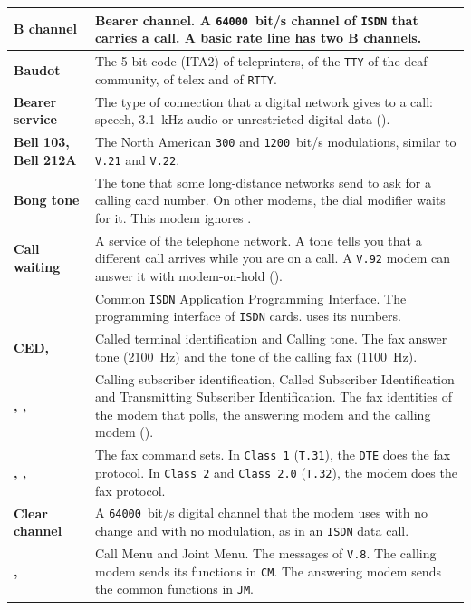 \documentclass[a5paper,10pt]{article}
\makeatletter
\newcommand{\cmd}[1]{\texttt{#1}}
\newcommand{\std}[1]{\texttt{#1}}
\newcommand{\stdb}[1]{\textpdfrender{TextRenderingMode=FillStroke,
  LineWidth=0.25pt}{\texttt{#1}}}
\newcommand{\cmdl}[2][]{\hyperlink{cmd:#1}{\cmd{#2}}}
\let\cmd\@firstofone
\makeatother
\begin{document}
{\begin{longtable}{|>{\raggedright\arraybackslash}p{}|>{\raggedright\arraybackslash}p{}|}
\textbf{B channel} & Bearer channel.  A \std{64000}~bit/s channel of \std{ISDN} that carries a call.  A basic rate line has two B channels. \\ \hline
\textbf{Baudot} & The 5-bit code (ITA2) of teleprinters, of the \std{TTY} of the deaf community, of telex and of \std{RTTY}. \\ \hline
\textbf{Bearer service} & The type of connection that a digital network gives to a call: speech, 3.1~kHz audio or unrestricted digital data (\cmdl[plusCBST]{+CBST}). \\ \hline
\textbf{Bell 103, Bell 212A} & The North American \std{300} and \std{1200}~bit/s modulations, similar to \std{V.21} and \std{V.22}. \\ \hline
\textbf{Bong tone} & The tone that some long-distance networks send to ask for a calling card number.  On other modems, the dial modifier \cmd{\$} waits for it.  This modem ignores \cmd{\$}. \\ \hline
\textbf{Call waiting} & A service of the telephone network.  A tone tells you that a different call arrives while you are on a call.  A \std{V.92} modem can answer it with modem-on-hold (\cmdl[plusPCW]{+PCW}). \\ \hline
\textbf{\stdb{CAPI}} & Common \std{ISDN} Application Programming Interface.  The programming interface of \std{ISDN} cards.  \cmdl[plusB2]{+B2} uses its numbers. \\ \hline
\textbf{CED, \stdb{CNG}} & Called terminal identification and Calling tone.  The fax answer tone (2100~Hz) and the tone of the calling fax (1100~Hz). \\ \hline
\textbf{\stdb{CIG}, \stdb{CSI}, \stdb{TSI}} & Calling subscriber identification, Called Subscriber Identification and Transmitting Subscriber Identification.  The fax identities of the modem that polls, the answering modem and the calling modem (\cmdl[plusFLI]{+FLI}). \\ \hline
\textbf{\stdb{Class 1}, \stdb{Class 2}, \stdb{Class 2.0}} & The fax command sets.  In \std{Class 1} (\std{T.31}), the \std{DTE} does the fax protocol.  In \std{Class 2} and \std{Class 2.0} (\std{T.32}), the modem does the fax protocol. \\ \hline
\textbf{Clear channel} & A \std{64000}~bit/s digital channel that the modem uses with no change and with no modulation, as in an \std{ISDN} data call. \\ \hline
\textbf{\stdb{CM}, \stdb{JM}} & Call Menu and Joint Menu.  The messages of \std{V.8}.  The calling modem sends its functions in \std{CM}.  The answering modem sends the common functions in \std{JM}. \\ \hline

\end{longtable}}
\end{document}
